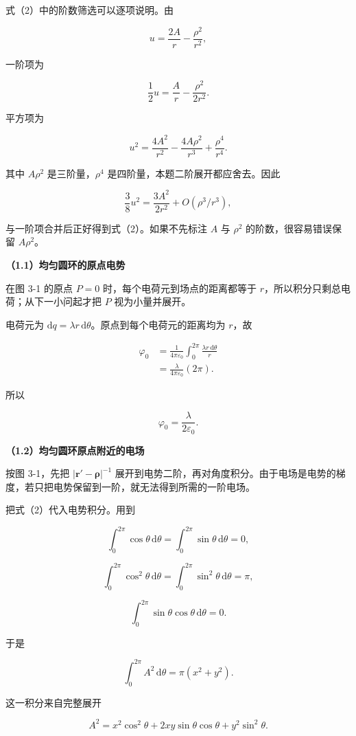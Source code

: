 \documentclass[12pt,a4paper,UTF8]{ctexart}
\begin{document}
式（2）中的阶数筛选可以逐项说明。由

\[u=\frac{2A}{r}-\frac{\rho^2}{r^2},\]

一阶项为

\[\frac12u=\frac{A}{r}-\frac{\rho^2}{2r^2}.\]

平方项为

\[u^2=\frac{4A^2}{r^2}
-\frac{4A\rho^2}{r^3}
+\frac{\rho^4}{r^4}.\]

其中 \(A\rho^2\) 是三阶量，\(\rho^4\)
是四阶量，本题二阶展开都应舍去。因此

\[\frac38u^2=\frac{3A^2}{2r^2}+O(\rho^3/r^3),\]

与一阶项合并后正好得到式（2）。如果不先标注 \(A\) 与 \(\rho^2\)
的阶数，很容易错误保留 \(A\rho^2\)。

\textbf{（1.1）均匀圆环的原点电势}

在图 3-1 的原点 \(P=0\) 时，每个电荷元到场点的距离都等于
\(r\)，所以积分只剩总电荷；从下一小问起才把 \(P\) 视为小量并展开。

电荷元为
\(\mathrm dq=\lambda r\,\mathrm d\theta\)。原点到每个电荷元的距离均为
\(r\)，故

\[\begin{aligned}
\varphi_0
&=\frac1{4\pi\varepsilon_0}
\int_0^{2\pi}\frac{\lambda r\,\mathrm d\theta}{r}\\
&=\frac{\lambda}{4\pi\varepsilon_0}(2\pi).
\end{aligned}\]

所以

\[\boxed{\varphi_0=\frac{\lambda}{2\varepsilon_0}}. \tag{3}\]

\textbf{（1.2）均匀圆环原点附近的电场}

按图 3-1，先把 \(|\boldsymbol r'-\boldsymbol\rho|^{-1}\)
展开到电势二阶，再对角度积分。由于电场是电势的梯度，若只把电势保留到一阶，就无法得到所需的一阶电场。

把式（2）代入电势积分。用到

\[\int_0^{2\pi}\cos\theta\,\mathrm d\theta
=\int_0^{2\pi}\sin\theta\,\mathrm d\theta=0,\]

\[\int_0^{2\pi}\cos^2\theta\,\mathrm d\theta
=\int_0^{2\pi}\sin^2\theta\,\mathrm d\theta=\pi,\]

\[\int_0^{2\pi}\sin\theta\cos\theta\,\mathrm d\theta=0.\]

于是

\[\int_0^{2\pi}A^2\,\mathrm d\theta
=\pi(x^2+y^2).\]

这一积分来自完整展开

\[A^2=x^2\cos^2\theta
+2xy\sin\theta\cos\theta
+y^2\sin^2\theta.\]
\end{document}
